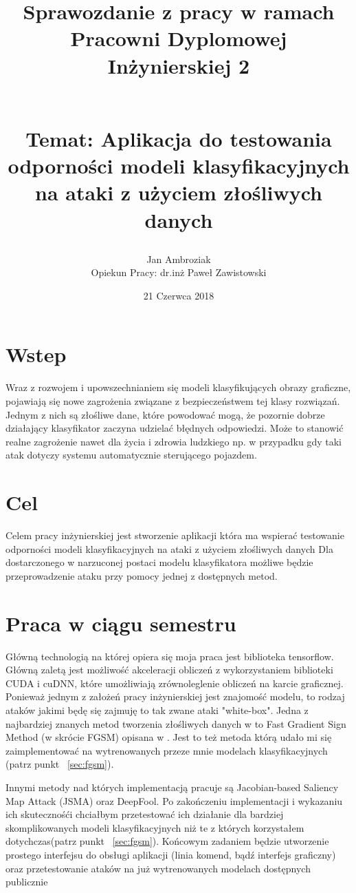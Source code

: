 \documentclass{article}
\title{
Sprawozdanie z pracy w ramach Pracowni Dyplomowej Inżynierskiej 2
\begin{large}
\\Temat: Aplikacja do testowania odporności
modeli klasyfikacyjnych na ataki z użyciem złośliwych danych
\end{large}}
\date{21 Czerwca 2018}
\author{Jan Ambroziak \\ Opiekun Pracy: dr.inż Paweł Zawistowski}
\begin{document}
\maketitle

\section{Wstep}
Wraz z rozwojem i upowszechnianiem się modeli klasyfikujących obrazy graficzne,
pojawiają się nowe zagrożenia związane z bezpieczeństwem tej klasy rozwiązań.
Jednym z nich są złośliwe dane, które powodować mogą,
że pozornie dobrze działający klasyfikator zaczyna udzielać błędnych odpowiedzi.
Może to stanowić realne zagrożenie nawet dla życia i zdrowia ludzkiego
np. w przypadku gdy taki atak dotyczy systemu automatycznie sterującego pojazdem.

\section{Cel}
\label{sec:target}
Celem pracy inżynierskiej jest stworzenie aplikacji która ma wspierać testowanie
odporności modeli klasyfikacyjnych na ataki z użyciem złośliwych danych
Dla dostarczonego w narzuconej postaci modelu klasyfikatora możliwe będzie
przeprowadzenie ataku przy pomocy jednej z dostępnych metod.

\section{Praca w ciągu semestru}
\label{sec:work}

Główną technologią na której opiera się moja praca jest biblioteka tensorflow\cite{tensorflow}.
Główną zaletą jest możliwość akceleracji obliczeń z wykorzystaniem biblioteki CUDA i cuDNN, które
umożliwiają zrównoleglenie obliczeń na karcie graficznej.
Ponieważ jednym z założeń pracy inżynierskiej jest znajomość modelu, to rodzaj
ataków jakimi będę się zajmuję to tak zwane ataki "white-box".
Jedna z najbardziej znanych metod tworzenia złośliwych danych w to
Fast Gradient Sign Method (w skrócie FGSM) opisana w \cite{harnessing}.
Jest to też metoda którą udało mi się zaimplementować na wytrenowanych przeze mnie
modelach klasyfikacyjnych (patrz punkt ~\ref{sec:fgsm}).

Innymi metody nad których implementacją pracuje są
Jacobian-based Saliency Map Attack (JSMA)\cite{DBLP:journals/corr/PapernotMJFCS15}
oraz DeepFool\cite{DBLP:journals/corr/Moosavi-Dezfooli15}.
Po zakończeniu implementacji i wykazaniu ich skutecznośći chciałbym
przetestować ich działanie dla bardziej skomplikowanych modeli klasyfikacyjnych
niż te z których korzystałem dotychczas(patrz punkt ~\ref{sec:fgsm}).
Końcowym zadaniem będzie utworzenie prostego interfejsu do obsługi aplikacji
(linia komend, bądź interfejs graficzny) oraz przetestowanie ataków na już
wytrenowanych modelach dostępnych publicznie
\end{document}
